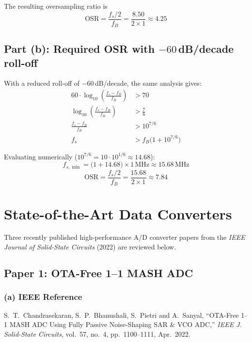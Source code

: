 \documentclass{article}
\begin{document}
  The resulting oversampling ratio is
  \begin{equation}
      \boxed{\mathrm{OSR} = \frac{f_s / 2}{f_B} = \frac{8.50}{2 \times 1} \approx 4.25}
  \end{equation}

  \subsection{Part (b): Required OSR with $-60$\,dB/decade roll-off}

  With a reduced roll-off of $-60$\,dB/decade, the same analysis gives:
  \begin{align}
      60 \cdot \log_{10}\!\left(\frac{f_s - f_B}{f_B}\right) &> 70 \\[6pt]
      \log_{10}\!\left(\frac{f_s - f_B}{f_B}\right) &> \frac{7}{6} \\[6pt]
      \frac{f_s - f_B}{f_B} &> 10^{7/6} \\[6pt]
      f_s &> f_B\bigl(1 + 10^{7/6}\bigr)
  \end{align}

  Evaluating numerically ($10^{7/6} = 10 \cdot 10^{1/6} \approx 14.68$):
  \begin{equation}
      f_{s,\min} = \bigl(1 + 14.68\bigr) \times 1\,\text{MHz} \approx 15.68\,\text{MHz}
  \end{equation}
  \begin{equation}
      \boxed{\mathrm{OSR} = \frac{f_s / 2}{f_B} = \frac{15.68}{2 \times 1} \approx 7.84}
  \end{equation}

  \section{State-of-the-Art Data Converters}

  Three recently published high-performance A/D converter papers from the \textit{IEEE Journal of Solid-State Circuits} (2022)
  are reviewed below.

  \subsection{Paper 1: OTA-Free 1--1 MASH ADC}

  \subsubsection*{(a) IEEE Reference}
  S.~T.~Chandrasekaran, S.~P.~Bhanushali, S.~Pietri and A.~Sanyal,
  ``OTA-Free 1--1 MASH ADC Using Fully Passive Noise-Shaping SAR \& VCO ADC,''
  \textit{IEEE J. Solid-State Circuits}, vol.~57, no.~4, pp.~1100--1111, Apr.~2022.
\end{document}
